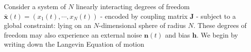 Consider a system of $N$ linearly interacting degrees of freedom $\mathbf{\bar x}(t) = \left(x_1(t),\cdots, x_N(t)\right)$ - encoded by coupling matrix $\mathbf{J}$ - subject to a global constraint: lying on an $N$-dimensional sphere of radius $N$. These degrees of freedom may also experience an external noise $\mathbf{n}(t)$ and bias $\mathbf{h}$. We begin by writing down the Langevin Equation of motion